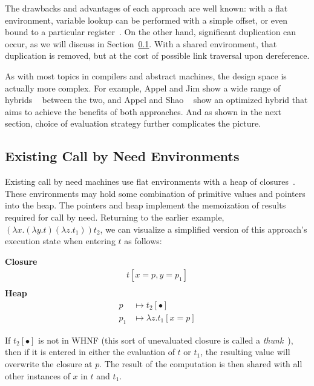 The drawbacks and advantages of each approach are well known: with a flat
environment, variable lookup can be performed with a simple offset, or even
bound to a particular register~\cite{jonesstg, appel2006compiling}. On the other
hand, significant duplication can occur, as we will discuss in Section~\ref{sec:exist}.
With a shared environment, that duplication is removed, but at the cost of
possible link traversal upon dereference. 

As with most topics in compilers and abstract machines, the design space is
actually more complex. For example, Appel and Jim show a wide range of hybrids
~\cite{appel1988optimizing} between the two, and Appel and Shao
~\cite{shao1994space} show an optimized hybrid that aims to achieve the benefits
of both approaches. And as shown in the next section, choice of evaluation
strategy further complicates the picture.

\subsection{Existing Call by Need Environments} \label{sec:exist}

Existing call by need machines use flat environments with a heap of
closures~\cite{jonesstg, TIM, johnsson1984efficient, boquist1997grin}. These
environments may hold some combination of primitive values and pointers into the
heap. The pointers and heap implement the memoization of results required for
call by need. Returning to the earlier example, $(\lambda x.(\lambda y.t)
(\lambda z.t_1)) t_2$, we can visualize a simplified version of this approach's
execution state when entering $t$ as follows:

\begin{center}
\textbf{Closure}
\begin{align*}
t[x=p, y=p_1] \\
\end{align*}
\textbf{Heap}
\begin{align*}
p &\mapsto t_2[\bullet] \\
p_1 &\mapsto \lambda z.t_1[x=p] 
\end{align*}
\end{center}

If $t_2[\bullet]$ is not in WHNF (this sort of unevaluated closure is called a
\emph{thunk}~\cite{ingerman1961way, peyton1992implementing}), then if it is
entered in either the evaluation of $t$ or $t_1$, the resulting value will
overwrite the closure at $p$. The result of the computation is then shared with
all other instances of $x$ in $t$ and $t_1$. 

